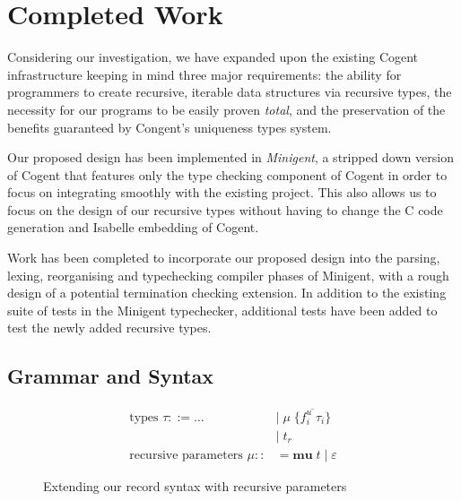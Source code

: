 \chapter{Completed Work}\label{ch:style}

Considering our investigation, we have expanded upon the existing Cogent infrastructure keeping in mind
three major requirements: the ability for programmers to create recursive, iterable data structures via
recursive types, the necessity for our programs to be easily proven \textit{total},
and the preservation of the benefits guaranteed by Congent's uniqueness types system.

Our proposed design has been implemented in \textit{Minigent}, a stripped down version of Cogent that
features only the type checking component of Cogent in order to focus on integrating smoothly with the 
existing project. This also allows us to focus on the design of our recursive types without having to change
the C code generation and Isabelle embedding of Cogent.

Work has been completed to incorporate our proposed design into the parsing, lexing, reorganising and 
typechecking compiler phases of Minigent, with a rough design of a potential termination checking extension.
In addition to the existing suite of tests in the Minigent typechecker, additional tests have 
been added to test the newly added recursive types.


\section{Grammar and Syntax}

\begin{figure}
    \centering
    \begin{align*}
        \text{types } \tau
            ::= \dots\; &|\; \mu\; \{ \overline{f_i^u\; \tau_i} \} \\
                        &|\; t_r \\
        \text{recursive parameters }\mu ::&= \textbf{mu}\; t\; |\; \varepsilon
    \end{align*}
    \caption{Extending our record syntax with recursive parameters}
    \vspace{2em}
    \label{fig:mu}
\end{figure}

